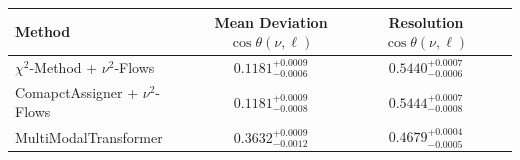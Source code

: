     \begin{tabular}{lccc}
        \toprule
        Method & Mean Deviation $\cos\theta(\nu, \ell)$ & Resolution $\cos\theta(\nu, \ell)$ \\
        \midrule
        $\chi^2$-Method + $\nu^2$-Flows & $0.1181^{+0.0009}_{-0.0006}$ & $0.5440^{+0.0007}_{-0.0006}$ \\
        ComapctAssigner + $\nu^2$-Flows & $0.1181^{+0.0009}_{-0.0008}$ & $0.5444^{+0.0007}_{-0.0008}$ \\
        MultiModalTransformer & $0.3632^{+0.0009}_{-0.0012}$ & $0.4679^{+0.0004}_{-0.0005}$ \\
        \bottomrule
    \end{tabular}